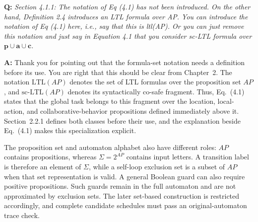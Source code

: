 \documentclass[11pt]{article}
\begin{document}
\begin{shaded*}
\noindent\textbf{Q:} \emph{Section 4.1.1: The notation of Eq (4.1) has not
been introduced. On the other hand, Definition 2.4 introduces an LTL formula over AP. You
can introduce the notation of Eq (4.1) here, i.e., say that this is ltl(AP). Or you can
just remove this notation and just say in Equation 4.1 that you consider sc-LTL formula
over $\mathbf{p}\cup\mathbf{a}\cup\mathbf{c}$.}
\end{shaded*}
\noindent\textbf{A:} Thank you for pointing out that the formula-set notation
needs a definition before its use. You are right that this should be clear
from Chapter~2. The notation $\mathrm{LTL}(AP)$ denotes the set of LTL formulas
over the proposition set $AP$, and $\mathrm{sc\mbox{-}LTL}(AP)$ denotes its
syntactically co-safe fragment. Thus, Eq.~(4.1) states that the global task
belongs to this fragment over the location, local-action, and collaborative-behavior
propositions defined immediately above it. Section~2.2.1 defines both classes
before their use, and the explanation beside Eq.~(4.1) makes this specialization
explicit.

The proposition set and automaton alphabet also have different roles:
$AP$ contains propositions, whereas $\Sigma=2^{AP}$ contains input letters.
A transition label is therefore an element of $\Sigma$, while a self-loop
exclusion set is a subset of $AP$ when that set representation is valid.
A general Boolean guard can also require positive propositions. Such guards
remain in the full automaton and are not approximated by exclusion sets.
The later set-based construction is restricted accordingly, and complete
candidate schedules must pass an original-automaton trace check.
\end{document}
